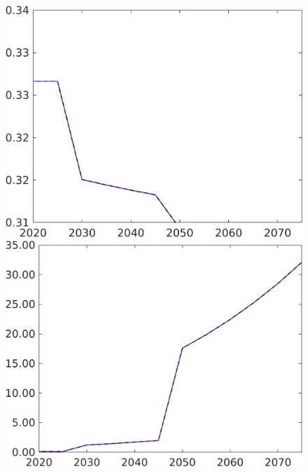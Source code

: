 \begin{figure}[h!!]
\begin{minipage}[]{0.32\textwidth}
	\end{minipage}
	\begin{minipage}[]{0.32\textwidth}
		\includegraphics[width=1\textwidth]{../../codding_model/own_basedOnFried/optimalPol_190722_tidiedUp/figures/all_July22/hl_DDCompEffOPT_T_NoTaus_pol4_spillover0_noskill0_sep1_xgrowth1_etaa0.79_lgd0_lff0.png}
	\end{minipage}
	\begin{minipage}[]{0.32\textwidth}
		\includegraphics[width=1\textwidth]{../../codding_model/own_basedOnFried/optimalPol_190722_tidiedUp/figures/all_July22/GFF_DDCompEffOPT_T_NoTaus_pol4_spillover0_noskill0_sep1_xgrowth1_etaa0.79_lgd0_lff0.png}

\end{minipage}
\end{figure}
